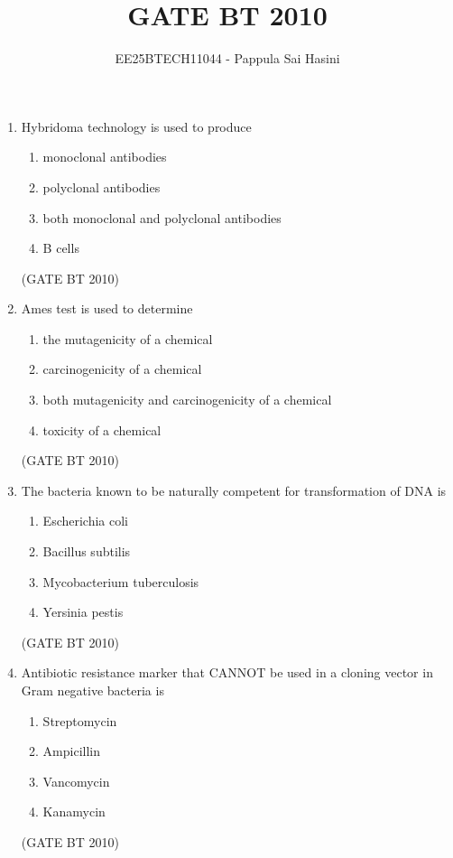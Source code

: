 \documentclass[journal,12pt,onecolumn]{IEEEtran}
\theoremstyle{remark}
\begin{document}
\title{GATE BT 2010}
\author{EE25BTECH11044 - Pappula Sai Hasini}
\maketitle
\renewcommand{\thefigure}{\theenumi}
\renewcommand{\thetable}{\theenumi}
\begin{enumerate}


\item Hybridoma technology is used to produce  
\begin{enumerate}
      \item monoclonal antibodies  
      \item polyclonal antibodies  
      \item both monoclonal and polyclonal antibodies  
      \item B cells  
\end{enumerate}
\hfill (GATE BT 2010)

\item Ames test is used to determine  
\begin{enumerate}
     \item the mutagenicity of a chemical  
     \item carcinogenicity of a chemical  
     \item both mutagenicity and carcinogenicity of a chemical  
     \item toxicity of a chemical  
\end{enumerate}
\hfill (GATE BT 2010)

\item The bacteria known to be naturally competent for transformation of DNA is  
\begin{enumerate}
    \item Escherichia coli  
    \item Bacillus subtilis  
    \item Mycobacterium tuberculosis  
    \item Yersinia pestis  
\end{enumerate}
\hfill (GATE BT 2010)

\item 
Antibiotic resistance marker that CANNOT be used in a cloning vector in Gram negative bacteria is  
\begin{enumerate}
    \item Streptomycin  
    \item Ampicillin  
    \item Vancomycin  
    \item Kanamycin  
\end{enumerate}
\hfill (GATE BT 2010)


\end{enumerate}
\end{document}
